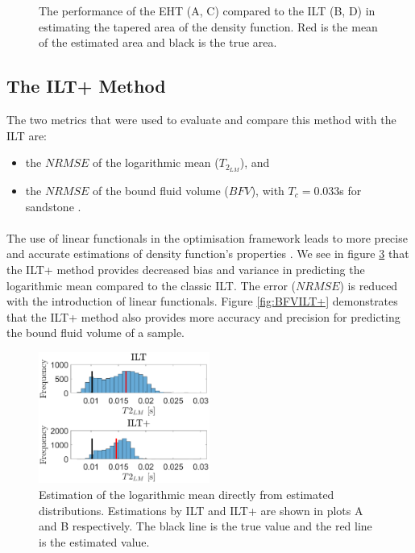 \begin{figure}
\begin{subfigure}[b]{0.49\textwidth}
        \label{fig:estTaperedAreaTc1}
    \end{subfigure}
    \caption{The performance of the EHT (A, C) compared to the ILT (B, D) in estimating the tapered area of the density function. Red is the mean of the estimated area and black is the true area.}
    \label{fig:estimateTaperedAreas}
\end{figure}


\subsection {The ILT+ Method}

The two metrics that were used to evaluate and compare this method with the ILT are:
\begin{itemize}
    \item the $NRMSE$ of the logarithmic mean ($T_{2_{LM}}$), and
    \item the $NRMSE$ of the bound fluid volume ($BFV$), with $T_c = 0.033 $s for sandstone \cite{TaperedAreaskleinberg1997tapered} \cite{wellLoggingBook}.
\end{itemize}

\paragraph{}
The use of linear functionals in the optimisation framework leads to more precise and accurate estimations of density function's properties \cite{GruberT2Estimation2013}. We see in figure \ref{fig:logMeanILT+} that the ILT+ method provides decreased bias and variance in predicting the logarithmic mean compared to the classic ILT. The error ($NRMSE$) is reduced with the introduction of linear functionals. Figure \ref{fig:BFVILT+} demonstrates that the ILT+ method also provides more accuracy and precision for predicting the bound fluid volume of a sample.

\begin{figure}[ht!]
    \centering
    \includegraphics[width=0.5\textwidth]{backgroundVector/logMeanSimulate.eps}
    \caption{Estimation of the logarithmic mean directly from estimated distributions. Estimations by ILT and ILT+ are shown in plots A and B respectively. The black line is the true value and the red line is the estimated value.}
    \label{fig:logMeanILT+}
\end{figure}

